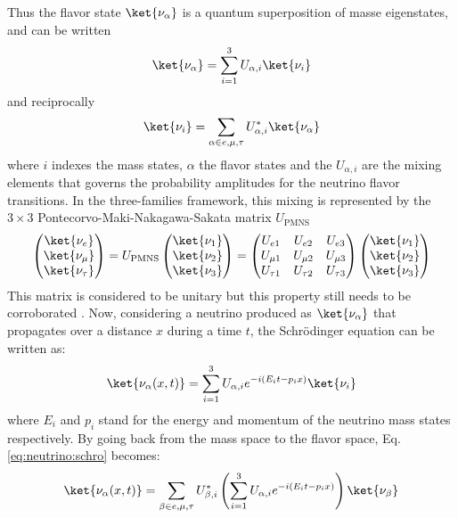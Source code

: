 Thus the flavor state $\ket{\nu_\alpha}$ is a quantum superposition of masse eigenstates, and can be written
\begin{equation}
  \ket{\nu_\alpha} = \sum_{i=1}^3 U_{\alpha, i} \ket{\nu_i}
\end{equation}
and reciprocally
\begin{equation}
  \ket{\nu_i} = \sum_{\alpha \in e,\mu,\tau} U^*_{\alpha, i} \ket{\nu_\alpha}
\end{equation}
where $i$ indexes the mass states, $\alpha$ the flavor states and the $U_{\alpha, i}$ are the mixing elements that governs the probability amplitudes for the neutrino flavor transitions. In the three-families framework, this mixing is represented by the $3 \times 3$ Pontecorvo-Maki-Nakagawa-Sakata matrix \cite{maki_remarks_1962} $U_{\text{PMNS}}$
\begin{equation}
  \begin{pmatrix}
    \ket{\nu_e} \\
    \ket{\nu_\mu} \\
    \ket{\nu_\tau}
  \end{pmatrix} = U_{\text{PMNS}} \begin{pmatrix}
    \ket{\nu_1} \\
    \ket{\nu_2} \\
    \ket{\nu_3}
  \end{pmatrix} = \begin{pmatrix}
  U_{e1} & U_{e2} & U_{e3} \\
  U_{\mu 1} & U_{\mu 2} & U_{\mu 3} \\
  U_{\tau 1} & U_{\tau 2} & U_{\tau 3}
  \end{pmatrix} \begin{pmatrix}
    \ket{\nu_1} \\
    \ket{\nu_2} \\
    \ket{\nu_3}
  \end{pmatrix}
\end{equation}
This matrix is considered to be unitary but this property still needs to be corroborated \cite{parke_unitarity_2016}. Now, considering a neutrino produced as $\ket{\nu_\alpha}$ that propagates over a distance $x$ during a time $t$, the Schrödinger equation \cite{schrodinger_undulatory_1926} can be written as:
\begin{equation}
  \label{eq:neutrino:schro}
  \ket{\nu_\alpha(x, t)} = \sum_{i=1}^3 U_{\alpha, i} e^{-i(E_it-p_ix)} \ket{\nu_i}
\end{equation}
where $E_i$ and $p_i$ stand for the energy and momentum of the neutrino mass states respectively. By going back from the mass space to the flavor space, Eq. \ref{eq:neutrino:schro} becomes:
\begin{equation}
  \ket{\nu_\alpha(x, t)} = \sum_{\beta \in e,\mu,\tau} U^*_{\beta, i} \left( \sum_{i=1}^3 U_{\alpha, i} e^{-i(E_it-p_ix)} \right) \ket{\nu_\beta}
\end{equation}

